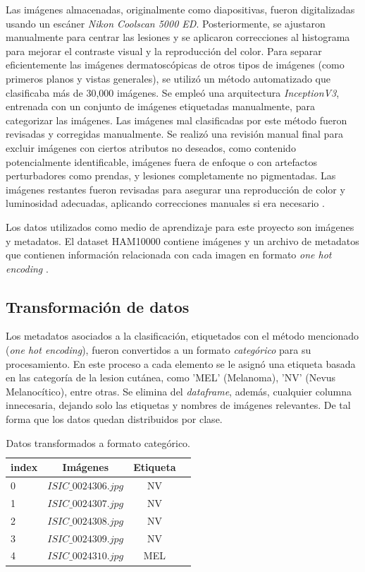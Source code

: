 Las imágenes almacenadas, originalmente como diapositivas, fueron digitalizadas usando un escáner \textit{Nikon Coolscan 5000 ED}. Posteriormente, se ajustaron manualmente para centrar las lesiones y se aplicaron correcciones al histograma para mejorar el contraste visual y la reproducción del color. Para separar eficientemente las imágenes dermatoscópicas de otros tipos de imágenes (como primeros planos y vistas generales), se utilizó un método automatizado que clasificaba más de 30,000 imágenes. Se empleó una arquitectura \textit{InceptionV3}, entrenada con un conjunto de imágenes etiquetadas manualmente, para categorizar las imágenes. Las imágenes mal clasificadas por este método fueron revisadas y corregidas manualmente.  Se realizó una revisión manual final para excluir imágenes con ciertos atributos no deseados, como contenido potencialmente identificable, imágenes fuera de enfoque o con artefactos perturbadores como prendas, y lesiones completamente no pigmentadas. Las imágenes restantes fueron revisadas para asegurar una reproducción de color y luminosidad adecuadas, aplicando correcciones manuales si era necesario . 


Los datos utilizados como medio de aprendizaje para este proyecto son imágenes y metadatos. El dataset HAM10000 contiene imágenes y un archivo de metadatos que contienen información relacionada con cada imagen en formato \textit{one hot encoding} .

\subsection{Transformación de datos}

Los metadatos asociados a la clasificación, etiquetados con el método mencionado (\textit{one hot encoding}), fueron convertidos a un formato \textit{categórico}  para su procesamiento. En este proceso a cada elemento se le asignó una etiqueta basada en las categoría de la lesion cutánea, como 'MEL' (Melanoma), 'NV' (Nevus Melanocítico), entre otras. Se elimina del \textit{dataframe}, además, cualquier columna innecesaria, dejando solo las etiquetas y nombres de imágenes relevantes. De tal forma que los datos quedan distribuidos por clase.

\begin{table}[ht]
   \centering
   \begin{tabular}{lccc}
   \hline
   \textbf{index} & \textbf{Imágenes} & \textbf{Etiqueta} \\
   \hline
      0 & $ISIC\_0024306.jpg$ & NV \\
      1 & $ISIC\_0024307.jpg$ & NV \\
      2 & $ISIC\_0024308.jpg$ & NV \\
      3 & $ISIC\_0024309.jpg$ & NV \\
      4 & $ISIC\_0024310.jpg$ & MEL \\
   \hline
   \end{tabular}
   \caption{Datos transformados a formato categórico.}
   \label{}
\end{table}   

